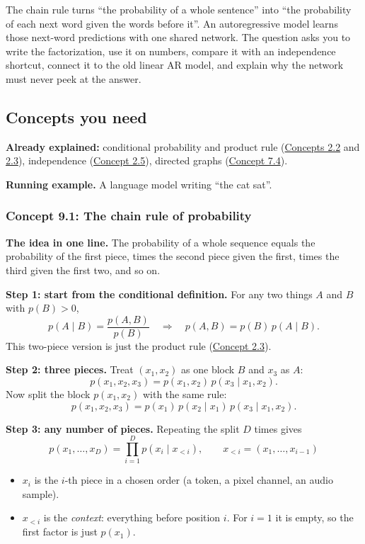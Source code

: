 \documentclass[12pt,a4paper]{article}
\begin{document}
The chain rule turns ``the probability of a whole sentence'' into ``the probability of each next word given the words before it''. An autoregressive model learns those next-word predictions with one shared network. The question asks you to write the factorization, use it on numbers, compare it with an independence shortcut, connect it to the old linear AR model, and explain why the network must never peek at the answer.

\subsection{Concepts you need}

\textbf{Already explained:} conditional probability and product rule (\hyperref[c2-2]{Concepts 2.2} and \hyperref[c2-3]{2.3}), independence (\hyperref[c2-5]{Concept 2.5}), directed graphs (\hyperref[c7-4]{Concept 7.4}).

\textbf{Running example.} A language model writing ``the cat sat''.

\subsubsection{Concept 9.1: The chain rule of probability}\label{c9-1}

\textbf{The idea in one line.} The probability of a whole sequence equals the probability of the first piece, times the second piece given the first, times the third given the first two, and so on.

\textbf{Step 1: start from the conditional definition.} For any two things $A$ and $B$ with $p(B)>0$,
\[
p(A\mid B)=\frac{p(A,B)}{p(B)}\quad\Longrightarrow\quad p(A,B)=p(B)\,p(A\mid B).
\]
This two-piece version is just the product rule (\hyperref[c2-3]{Concept 2.3}).

\textbf{Step 2: three pieces.} Treat $(x_1,x_2)$ as one block $B$ and $x_3$ as $A$:
\[
p(x_1,x_2,x_3)=p(x_1,x_2)\,p(x_3\mid x_1,x_2).
\]
Now split the block $p(x_1,x_2)$ with the same rule:
\[
p(x_1,x_2,x_3)=p(x_1)\,p(x_2\mid x_1)\,p(x_3\mid x_1,x_2).
\]

\textbf{Step 3: any number of pieces.} Repeating the split $D$ times gives
\[
p(x_1,\dots,x_D)=\prod_{i=1}^{D}p(x_i\mid x_{<i}),\qquad x_{<i}=(x_1,\dots,x_{i-1})
\]
\begin{itemize}[nosep]
  \item $x_i$ is the $i$-th piece in a chosen order (a token, a pixel channel, an audio sample).
  \item $x_{<i}$ is the \emph{context}: everything before position $i$. For $i=1$ it is empty, so the first factor is just $p(x_1)$.
\end{itemize}
\end{document}
